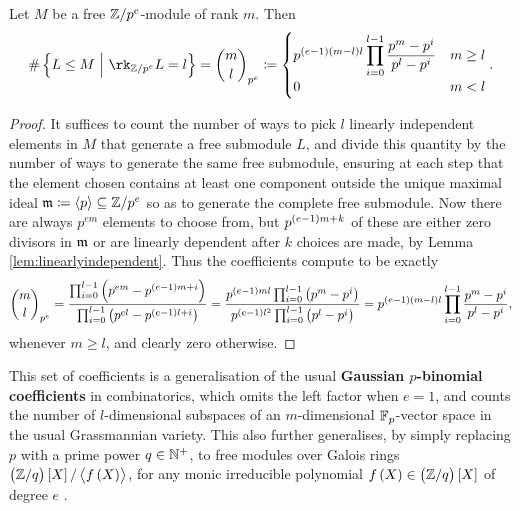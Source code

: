 \pagebreak

\begin{proposition}
\label{prop:dimensionsummand}
Let $ M $ be a free $ \mathbb{Z} / p^e $-module of rank $ m $. Then
$$ \#\cbr{L \le M \st \rk_{\ZZ / p^e} L = l} = \binom{m}{l}_{p^e} \coloneqq
\begin{cases}
p^{\br{e - 1}\br{m - l}l}\displaystyle\prod_{i = 0}^{l - 1} \dfrac{p^m - p^i}{p^l - p^i} & m \ge l \\
0 & m < l
\end{cases}.
$$
\end{proposition}

\begin{proof}
It suffices to count the number of ways to pick $ l $ linearly independent elements in $ M $ that generate a free submodule $ L $, and divide this quantity by the number of ways to generate the same free submodule, ensuring at each step that the element chosen contains at least one component outside the unique maximal ideal $ \mathfrak{m} \coloneqq \left\langle p \right\rangle \subseteq \mathbb{Z} / p^e $ so as to generate the complete free submodule. Now there are always $ p^{em} $ elements to choose from, but $ p^{\br{e - 1}m + k} $ of these are either zero divisors in $ \mathfrak{m} $ or are linearly dependent after $ k $ choices are made, by Lemma \ref{lem:linearlyindependent}. Thus the coefficients compute to be exactly
$$ \binom{m}{l}_{p^e} = \dfrac{\prod_{i = 0}^{l - 1} \br{p^{em} - p^{\br{e - 1}m + i}}}{\prod_{i = 0}^{l - 1} \br{p^{el} - p^{\br{e - 1}l + i}}} = \dfrac{p^{\br{e - 1}ml}\prod_{i = 0}^{l - 1} \br{p^m - p^i}}{p^{\br{e - 1}l^2}\prod_{i = 0}^{l - 1} \br{p^l - p^i}} = p^{\br{e - 1}\br{m - l}l}\displaystyle\prod_{i = 0}^{l - 1} \dfrac{p^m - p^i}{p^l - p^i}, $$
whenever $ m \ge l $, and clearly zero otherwise.
\end{proof}

\begin{remark}
This set of coefficients is a generalisation of the usual \textbf{Gaussian $ p $-binomial coefficients} in combinatorics, which omits the left factor when $ e = 1 $, and counts the number of $ l $-dimensional subspaces of an $ m $-dimensional $ \mathbb{F}_p $-vector space in the usual Grassmannian variety. This also further generalises, by simply replacing $ p $ with a prime power $ q \in \mathbb{N}^+ $, to free modules over Galois rings $ \br{\ZZ / q}\sbr{X} / \abr{f\br{X}} $, for any monic irreducible polynomial $ f\br{X} \in \br{\ZZ / q}\sbr{X} $ of degree $ e $ \cite[Theorem 3.7]{DKK08}.
\end{remark}

